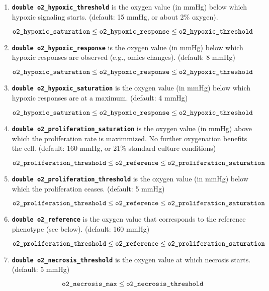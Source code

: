 \documentclass[12pt]{article}
\newcommand{\smallcode}[1]{\textbf{\texttt{#1}}}
\begin{document}
\begin{enumerate}
\item 
\smallcode{double o2\_hypoxic\_threshold} is the oxygen value (in mmHg) 
below which hypoxic signaling starts. (default: 15 mmHg, or about 2\% oxygen).  

$$
\verb|o2_hypoxic_saturation| \le \verb|o2_hypoxic_response| \le \verb|o2_hypoxic_threshold|
$$

\item 
\smallcode{double o2\_hypoxic\_response} is the oxygen value (in mmHg) 
below which hypoxic responses are observed (e.g., omics changes). 
(default: 8 mmHg) 

$$
\verb|o2_hypoxic_saturation| \le \verb|o2_hypoxic_response| \le \verb|o2_hypoxic_threshold|
$$

\item 
\smallcode{double o2\_hypoxic\_saturation} is the oxygen value (in mmHg) 
below which hypoxic responses are at a maximum. 
(default: 4 mmHg) 

$$
\verb|o2_hypoxic_saturation| \le \verb|o2_hypoxic_response| \le \verb|o2_hypoxic_threshold|
$$


\item 
\smallcode{double o2\_proliferation\_saturation} is the oxygen value (in mmHg) 
above which the proliferation rate is maximmized. No further 
oxygenation benefits the cell. (default: 160 mmHg, or 21\% standard culture conditions)

$$
\verb|o2_proliferation_threshold| \le \verb|o2_reference| \le \verb|o2_proliferation_saturation|
$$

\item 
\smallcode{double o2\_proliferation\_threshold} is the oxygen value (in mmHg) 
below which the proliferation ceases. (default: 5 mmHg)

$$
\verb|o2_proliferation_threshold| \le \verb|o2_reference| \le \verb|o2_proliferation_saturation|
$$

\item 
\smallcode{double o2\_reference} is the oxygen value that corresponds to the 
reference phenotype (see below). (default: 160 mmHg) 

$$
\verb|o2_proliferation_threshold| \le \verb|o2_reference| \le \verb|o2_proliferation_saturation|
$$

\item 
\smallcode{double o2\_necrosis\_threshold} is the oxygen value at which 
necrosis starts. (default: 5 mmHg) 

$$
\verb|o2_necrosis_max| \le \verb|o2_necrosis_threshold|
$$


\end{enumerate}
\end{document}
